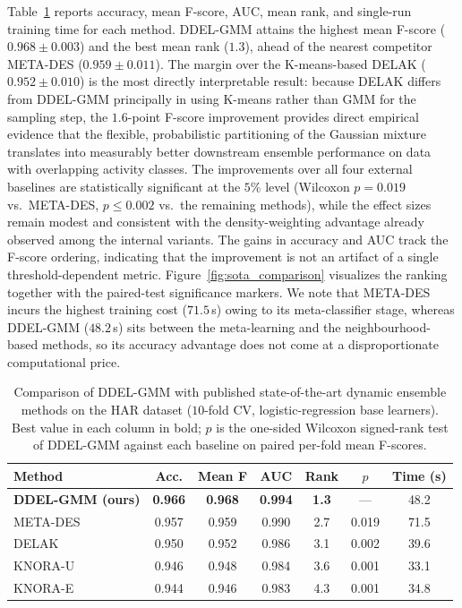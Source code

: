 \documentclass[lettersize,journal]{IEEEtran}
\begin{document}
{	\noindent Table~\ref{tab:sota_comparison} reports accuracy, mean F-score, AUC, mean rank, and single-run training time for each method. DDEL-GMM attains the highest mean F-score ($0.968 \pm 0.003$) and the best mean rank ($1.3$), ahead of the nearest competitor META-DES ($0.959 \pm 0.011$). The margin over the K-means-based DELAK ($0.952 \pm 0.010$) is the most directly interpretable result: because DELAK differs from DDEL-GMM principally in using K-means rather than GMM for the sampling step, the $1.6$-point F-score improvement provides direct empirical evidence that the flexible, probabilistic partitioning of the Gaussian mixture translates into measurably better downstream ensemble performance on data with overlapping activity classes. The improvements over all four external baselines are statistically significant at the $5\%$ level (Wilcoxon $p = 0.019$ vs.\ META-DES, $p \leq 0.002$ vs.\ the remaining methods), while the effect sizes remain modest and consistent with the density-weighting advantage already observed among the internal variants. The gains in accuracy and AUC track the F-score ordering, indicating that the improvement is not an artifact of a single threshold-dependent metric. Figure~\ref{fig:sota_comparison} visualizes the ranking together with the paired-test significance markers. We note that META-DES incurs the highest training cost ($71.5$\,s) owing to its meta-classifier stage, whereas DDEL-GMM ($48.2$\,s) sits between the meta-learning and the neighbourhood-based methods, so its accuracy advantage does not come at a disproportionate computational price.
	
	\begin{table}[htbp]
		\begin{center}
			\caption{Comparison of DDEL-GMM with published state-of-the-art dynamic ensemble methods on the HAR dataset ($10$-fold CV, logistic-regression base learners). Best value in each column in bold; $p$ is the one-sided Wilcoxon signed-rank test of DDEL-GMM against each baseline on paired per-fold mean F-scores.}
			\label{tab:sota_comparison}
			\setlength{\tabcolsep}{3pt}
			\begin{tabular}{|l|c|c|c|c|c|c|}
				\hline
				\textbf{Method} & \textbf{Acc.} & \textbf{Mean F} & \textbf{AUC} & \textbf{Rank} & \textbf{$p$} & \textbf{Time (s)} \\
				\hline
				\textbf{DDEL-GMM (ours)} & \textbf{0.966} & \textbf{0.968} & \textbf{0.994} & \textbf{1.3} & --- & 48.2 \\
				\hline
				META-DES \cite{cruz_meta-oracle_2017} & 0.957 & 0.959 & 0.990 & 2.7 & 0.019 & 71.5 \\
				\hline
				DELAK \cite{guo_dynamic_2021} & 0.950 & 0.952 & 0.986 & 3.1 & 0.002 & 39.6 \\
				\hline
				KNORA-U \cite{ko_dynamic_2008} & 0.946 & 0.948 & 0.984 & 3.6 & 0.001 & 33.1 \\
				\hline
				KNORA-E \cite{ko_dynamic_2008} & 0.944 & 0.946 & 0.983 & 4.3 & 0.001 & 34.8 \\
				\hline
			\end{tabular}
		\end{center}
	\end{table}
	
}
\end{document}

